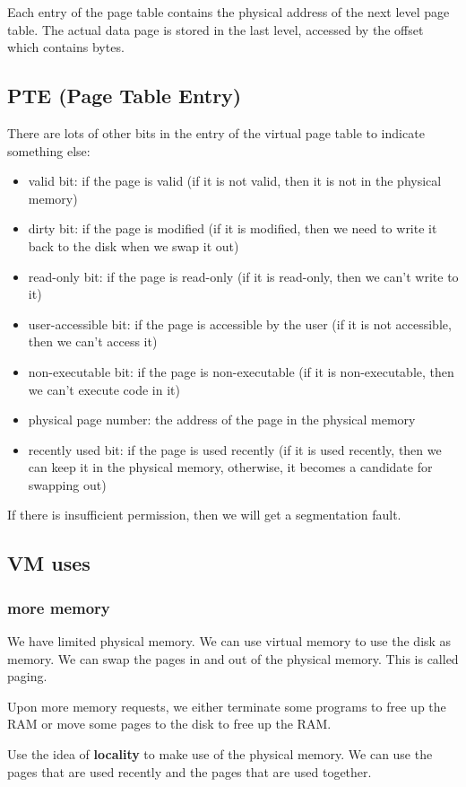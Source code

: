 \documentclass[letterpaper,12pt]{article}
\begin{document}
Each entry of the page table contains the physical address of the next level
page table. The actual data page is stored in the last level, accessed by the
offset which contains bytes.
\subsection{PTE (Page Table Entry)}
There are lots of other bits in the entry of the virtual page table to indicate
something else:\begin{itemize}
    \item valid bit: if the page is valid (if it is not valid, then it is not in the
          physical memory)
    \item dirty bit: if the page is modified (if it is modified, then we need to write it
          back to the disk when we swap it out)
    \item read-only bit: if the page is read-only (if it is read-only, then we can't
          write to it)
    \item user-accessible bit: if the page is accessible by the user (if it is not
          accessible, then we can't access it)
    \item non-executable bit: if the page is non-executable (if it is non-executable,
          then we can't execute code in it)
    \item physical page number: the address of the page in the physical memory
    \item recently used bit: if the page is used recently (if it is used recently, then
          we can keep it in the physical memory, otherwise, it becomes a candidate for
          swapping out)
\end{itemize}
If there is insufficient permission, then we will get a segmentation fault.
\subsection{VM uses}
\subsubsection{more memory}
We have limited physical memory. We can use virtual memory to use the disk as
memory. We can swap the pages in and out of the physical memory. This is called
paging.

Upon more memory requests, we either terminate some programs to free up the RAM
or move some pages to the disk to free up the RAM.

Use the idea of \textbf{locality} to make use of the physical memory. We can
use the pages that are used recently and the pages that are used together.
\end{document}
